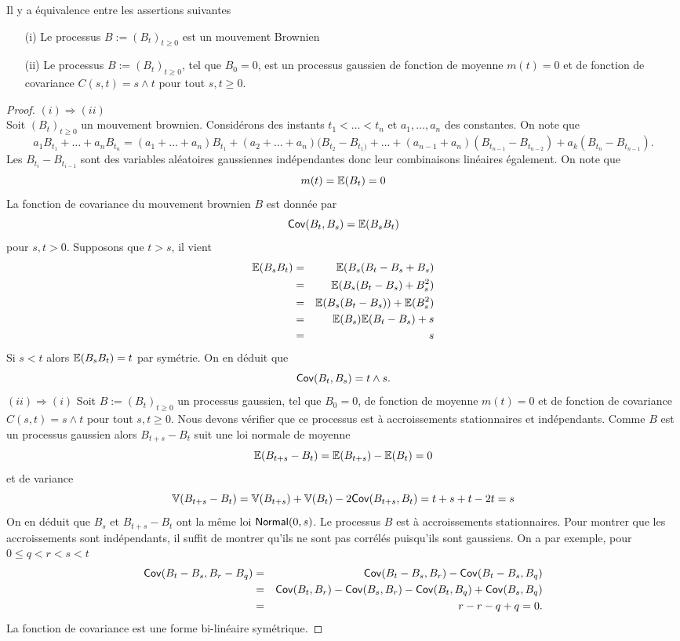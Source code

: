 \begin{prop}
Il y a équivalence entre les assertions suivantes 
\begin{itemize}
  \item[(i)] Le processus $B:=(B_t)_{t\geq 0}$ est un mouvement Brownien
  \item[(ii)] Le processus $B:=(B_t)_{t\geq 0}$, tel que $B_0 = 0$, est un processus gaussien de fonction de moyenne $m(t) = 0$ et de fonction de covariance $C(s,t) = s\land t$ pour tout $s,t\geq 0$.
\end{itemize}
\end{prop}
\begin{proof}
$(i)\Rightarrow (ii)$ \\
Soit $(B_t)_{t\geq0}$ un mouvement brownien. Considérons des instants $t_1<\ldots < t_n$ et $a_1,\ldots, a_n$ des constantes. On note que 
$$
a_1B_{t_1}+\ldots + a_n B_{t_n} = (a_1+\ldots + a_n)B_{t_1}+(a_2+\ldots + a_n)(B_{t_2}-B_{t_1)}+\ldots+(a_{n-1}+ a_{n})(B_{t_{n-1}}- B_{t_{n-2}})+ a_k(B_{t_n}- B_{t_{n-1}}).
$$
Les $B_{t_i}- B_{t_{i-1}}$ sont des variables aléatoires gaussiennes indépendantes donc leur combinaisons linéaires également. On note que 
$$
m(t) = \mathbb{E}(B_t) = 0
$$
La fonction de covariance du mouvement brownien $B$ est donnée par
$$\mathsf{Cov}(B_t, B_s) = \mathbb{E}(B_sB_t)$$
pour $s,t>0$. Supposons que $t>s$, il vient 
\begin{eqnarray*}
\mathbb{E}(B_sB_t) &= &\mathbb{E}(B_s(B_t-B_s + B_s)\\
&= &\mathbb{E}(B_s(B_t-B_s) + B_s^2)\\
&= &\mathbb{E}(B_s(B_t-B_s)) + \mathbb{E}(B_s^2)\\
&= &\mathbb{E}(B_s)\mathbb{E}(B_t-B_s) + s\\
&= & s\\
\end{eqnarray*}
Si $s<t$ alors $\mathbb{E}(B_sB_t) = t$ par symétrie. On en déduit que 
$$
\mathsf{Cov}(B_t, B_s) = t\land s.
$$
$(ii)\Rightarrow (i)$
Soit $B:=(B_t)_{t\geq 0}$ un processus gaussien, tel que $B_0 = 0$, de fonction de moyenne $m(t) = 0$ et de fonction de covariance $C(s,t) = s\land t$ pour tout $s,t\geq 0$. Nous devons vérifier que ce processus est à accroissements stationnaires et indépendants. Comme $B$ est un processus gaussien alors $B_{t+s}- B_t$ suit une loi normale de moyenne 
$$
\mathbb{E}(B_{t+s}- B_t) =\mathbb{E}(B_{t+s})- \mathbb{E}(B_t) = 0
$$
et de variance 
$$
\mathbb{V}(B_{t+s}- B_t) = \mathbb{V}(B_{t+s}) + \mathbb{V}(B_t) - 2\mathsf{Cov}(B_{t+s}, B_{t}) = t+s + t - 2 t = s
$$
On en déduit que $B_s$ et $B_{t+s}-B_{t}$ ont la même loi $\mathsf{Normal}(0, s)$. Le processus $B$ est à accroissements stationnaires. Pour montrer que les accroissements sont indépendants, il suffit de montrer qu'ils ne sont pas corrélés puisqu'ils sont gaussiens. On a par exemple, pour $0\leq q<r<s<t$ 
\begin{eqnarray*}
\mathsf{Cov}(B_t-B_s, B_r-B_q) &=& \mathsf{Cov}(B_t-B_s, B_r) - \mathsf{Cov}(B_t-B_s, B_q)\\
&=& \mathsf{Cov}(B_t, B_r) - \mathsf{Cov}(B_s, B_r) - \mathsf{Cov}(B_t, B_q) + \mathsf{Cov}(B_s, B_q)\\
&=& r -r -q+q=0.
\end{eqnarray*}
La fonction de covariance est une forme bi-linéaire symétrique.
\end{proof}
